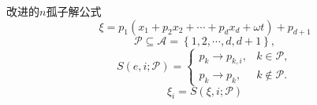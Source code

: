 \documentclass[handout]{beamer}
\newcommand{\sbrace}[1]{\left(#1\right)}
\newcommand{\bbrace}[1]{\left\{#1\right\}}
\newcommand{\ALLP}{\mathcal{A}}
\newcommand{\PS}{\mathcal{P}}
\begin{document}
\begin{frame}{改进的$n$孤子解公式}
\begin{equation}
  \xi=p_1(x_1+p_2x_2+\cdots+p_d x_d+\omega t)+p_{d+1}
\end{equation}
\begin{equation}
\PS\subseteq \ALLP=\bbrace{1,2,\cdots,d,d+1} ,
\end{equation}
\begin{equation}
S\sbrace{e,i;\PS}=\left\{\begin{array}{ll}
  p_k \to p_{k,i}, & k \in \PS ,\\ 
  p_k \to p_k , & k \not\in\PS .
\end{array}\right.
\end{equation}
\begin{equation}
  \xi_i=S(\xi,i;\PS)
\end{equation}
\end{frame}
\end{document}
